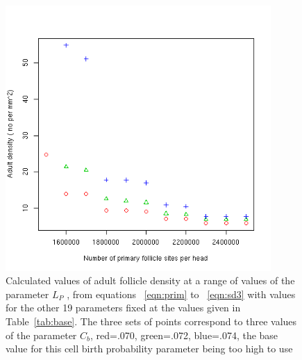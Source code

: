%

\begin{figure}[!h]
  \centering
   \includegraphics[width=0.9\textwidth]{lpdens.png}
  \caption{Calculated values of adult follicle density at a range of values of the parameter $L_{P}$ ,  from equations ~\ref{eqn:prim} to ~\ref{eqn:sd3} with values for the other 19  parameters fixed at the values given in Table~\ref{tab:base}. The three sets of points correspond to three values of the parameter $C_{b}$, red=.070, green=.072, blue=.074, the base value for this cell birth probability parameter being too high to use}
  \label{fig:lpdens}
\end{figure}

%

